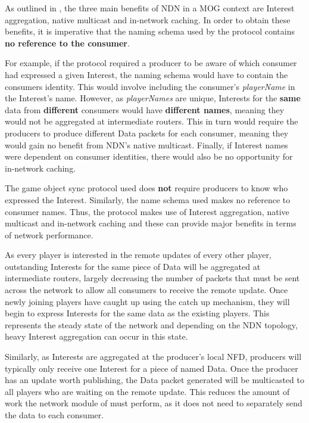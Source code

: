 As outlined in , the three main benefits of NDN in a MOG context are Interest aggregation, native multicast and in-network caching. In order to obtain these benefits, it is imperative that the naming schema used by the protocol contains \textbf{no reference to the consumer}.

For example, if the protocol required a producer to be aware of which consumer had expressed a given Interest, the naming schema would have to contain the consumers identity. This would involve including the consumer's \textit{playerName} in the Interest's name. However, as \textit{playerNames} are unique, Interests for the \textbf{same} data from \textbf{different} consumers would have \textbf{different names}, meaning they would not be aggregated at intermediate routers. This in turn would require the producers to produce different Data packets for each consumer, meaning they would gain no benefit from NDN's native multicast. Finally, if Interest names were dependent on consumer identities, there would also be no opportunity for in-network caching.

The game object sync protocol used does \textbf{not} require producers to know who expressed the Interest. Similarly, the name schema used makes no reference to consumer names. Thus, the protocol makes use of Interest aggregation, native multicast and in-network caching and these can provide major benefits in terms of network performance.

As every player is interested in the remote updates of every other player, outstanding Interests for the same piece of Data will be aggregated at intermediate routers, largely decreasing the number of packets that must be sent across the network to allow all consumers to receive the remote update. Once newly joining players have caught up using the catch up mechanism, they will begin to express Interests for the same data as the existing players. This represents the steady state of the network and depending on the NDN topology, heavy Interest aggregation can occur in this state.

Similarly, as Interests are aggregated at the producer's local NFD, producers will typically only receive one Interest for a piece of named Data. Once the producer has an update worth publishing, the Data packet generated will be multicasted to all players who are waiting on the remote update. This reduces the amount of work the network module of \game{} must perform, as it does not need to separately send the data to each consumer.

